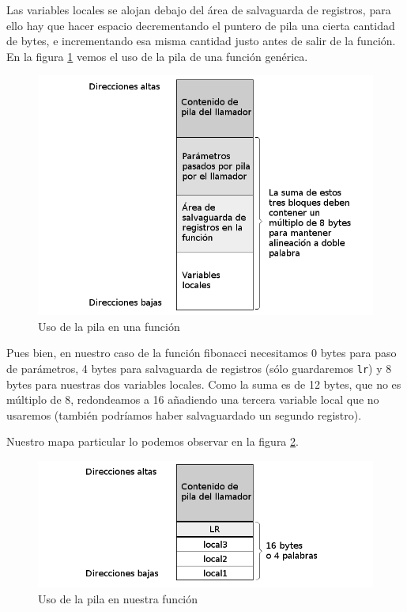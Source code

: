 Las variables locales se alojan debajo del área de salvaguarda de registros, para ello hay que
hacer espacio decrementando el puntero de pila una cierta cantidad de bytes, e incrementando esa
misma cantidad justo antes de salir de la función. En la figura \ref{fig:pila} vemos el uso de la pila
de una función genérica.

\begin{figure}[h]
  \centering
    \includegraphics[width=14cm]{graphs/pila.png}
  \caption{Uso de la pila en una función}
  \label{fig:pila}
\end{figure}

Pues bien, en nuestro caso de la función fibonacci necesitamos 0 bytes para paso de parámetros,
4 bytes para salvaguarda de registros (sólo guardaremos {\tt lr}) y 8 bytes para nuestras
dos variables locales. Como la suma es de 12 bytes, que no es múltiplo de 8, redondeamos a 16
añadiendo una tercera variable local que no usaremos (también podríamos haber salvaguardado un
segundo registro).

Nuestro mapa particular lo podemos observar en la figura \ref{fig:pila2}.

\begin{figure}[h]
  \centering
    \includegraphics[width=14cm]{graphs/pila2.png}
  \caption{Uso de la pila en nuestra función}
  \label{fig:pila2}
\end{figure}

